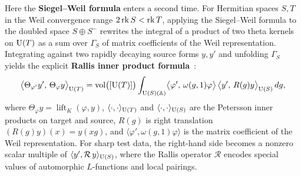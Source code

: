 Here the \textbf{Siegel--Weil formula} enters a second time. For Hermitian spaces $S,T$ in the Weil convergence range $2\operatorname{rk} S<\operatorname{rk} T$, applying the Siegel--Weil formula to the doubled space $S\oplus S^-$ rewrites the integral of a product of two theta kernels on $\operatorname{U}(T)$ as a sum over $\Gamma_S$ of matrix coefficients of the Weil representation. Integrating against two rapidly decaying source forms $y,y'$ and unfolding $\Gamma_S$ yields the explicit \textbf{Rallis inner product formula}~\cite{Li1992,KudlaRallis1994,GQT2014}:
\[
\bigl\langle \Theta_{\varphi'}y',\,\Theta_\varphi y\bigr\rangle_{\operatorname{U}(T)}
=\operatorname{vol}\bigl([\operatorname{U}(T)]\bigr)
 \int_{\operatorname{U}(S)(\mathbb{A})}
   \bigl\langle \varphi',\,\omega(g,1)\varphi\bigr\rangle\,
   \bigl\langle y',\,R(g)y\bigr\rangle_{\operatorname{U}(S)}\,dg,
\]
where $\Theta_\varphi y=\operatorname{lift}_K(\varphi,y)$, $\langle\cdot,\cdot\rangle_{\operatorname{U}(T)}$ and $\langle\cdot,\cdot\rangle_{\operatorname{U}(S)}$ are the Petersson inner products on target and source, $R(g)$ is right translation $(R(g)y)(x)=y(xg)$, and $\langle\varphi',\omega(g,1)\varphi\rangle$ is the matrix coefficient of the Weil representation. For sharp test data, the right-hand side becomes a nonzero scalar multiple of $\langle y',\mathcal R\,y\rangle_{\operatorname{U}(S)}$, where the Rallis operator $\mathcal R$ encodes special values of automorphic $L$-functions and local pairings.

